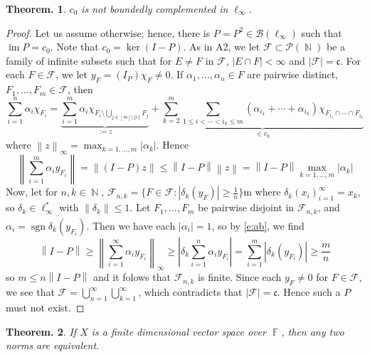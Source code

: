 \documentclass[11pt, a4paper]{memoir}
\DeclareMathOperator{\N}{{\mathbb{N}}}
\DeclareMathOperator{\F}{{\mathbb{F}}}
\newcommand{\norm}[1]{\ensuremath{\left\lVert#1\right\rVert}}
\theoremstyle{change}
\newtheorem{theorem}{Theorem.}[section]
\theoremstyle{plain}
\theoremstyle{nonumberplain}
\newtheorem{proof}{Proof}
\DeclareMathOperator{\im}{im}
\DeclareMathOperator{\sgn}{sgn}
\numberwithin{equation}{section}
\begin{document}
\begin{theorem}
    $c_0$ is not boundedly complemented in $\ell_\infty$.
\end{theorem}
\begin{proof}
    Let us assume otherwise; hence, there is $P=P^2\in\mathcal{B}(\ell_\infty)$ such that $\im P=c_0$.
    Note that $c_0=\ker(I-P)$.
    As in A2, we let $\mathcal{F}\subset\mathcal{P}(\N)$ be a family of infinite subsets such that for $E\neq F$ in $\mathcal{F}$, $|E\cap F|<\infty$ and $|\mathcal{F}|=\mathfrak{c}$.
    For each $F\in\mathcal{F}$, we let $y_F=(I_P)\chi_F\neq 0$.
    If $\alpha_1,\ldots,\alpha_n\in F$ are pairwise distinct, $F_1,\ldots,F_m\in\mathcal{F}$, then
    \begin{equation*}
        \sum_{i=1}^n\alpha_i\chi_{F_i}=\underbrace{\sum_{i=1}^m\alpha_i\chi_{F_i\setminus\bigcup_{j\in[m]\setminus\{i\}}F_j}}_{:= z}+\underbrace{\sum_{k=2}^m\sum_{1\leq i<\cdots<i_k\leq m}(\alpha_{i_1}+\cdots+\alpha_{i_k})\chi_{F_{i_1}\cap\cdots\cap F_{i_k}}}_{\in c_0}
    \end{equation*}
    where $\norm{z}_\infty=\max_{k=1,\ldots,m}|\alpha_k|$.
    Hence
    \begin{equation}\label{e:ab}
        \norm{\sum_{i=1}^m\alpha_iy_{F_i}}=\norm{(I-P)z}\leq\norm{I-P}\norm{z}=\norm{I-P}\max_{k=1,\ldots,m}|\alpha_k|
    \end{equation}
    Now, let for $n,k\in\N$, $\mathcal{F}_{n,k}=\{F\in\mathcal{F}:|\delta_k(y_F)|\geq\frac{1}{n}\}$m where $\delta_k(x_i)_{i=1}^\infty=x_k$, so $\delta_k\in\ell_\infty^*$ with $\norm{\delta_k}\leq 1$.
    Let $F_1,\ldots,F_m$ be pairwise disjoint in $\mathcal{F}_{n,k}$, and $\alpha_i=\overline{\sgn\delta_k(y_{F_i})}$.
    Then we have each $|\alpha_i|=1$, so by \cref{e:ab}, we find
    \begin{equation*}
        \norm{I-P}\geq\norm{\sum_{i=1}^\infty\alpha_iy_{F_i}}_\infty\geq|\delta_k\sum_{i=1}^n\alpha_iy_{F_i}|=\sum_{i=1}^m|\delta_k(y_{F_i})|\geq\frac{m}{n}
    \end{equation*}
    so $m\leq n\norm{I-P}$ and it folows that $\mathcal{F}_{n,k}$ is finite.
    Since each $y_F\neq 0$ for $F\in\mathcal{F}$, we see that $\mathcal{F}=\bigcup_{n=1}^\infty\bigcup_{k=1}^\infty$, which contradicts that $|\mathcal{F}|=\mathfrak{c}$.
    Hence such a $P$ must not exist.
\end{proof}
\begin{theorem}
    If $X$ is a finite dimensional vector space over $\F$, then any two norms are equivalent.
\end{theorem}
\end{document}
